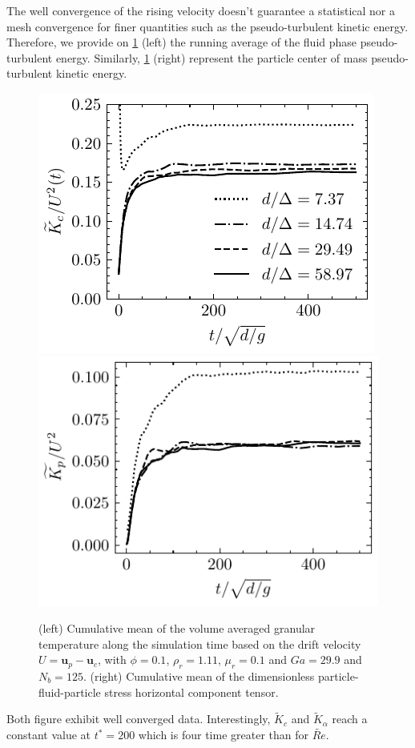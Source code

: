 The well convergence of the rising velocity doesn't guarantee a statistical nor a mesh convergence for finer quantities such as the pseudo-turbulent kinetic energy. 
Therefore, we provide on \ref{fig:UpUp} (left) the running average of the fluid phase pseudo-turbulent energy. 
Similarly, \ref{fig:UpUp} (right) represent the particle center of mass pseudo-turbulent kinetic energy. 
\begin{figure}[h!]
    \centering
    \includegraphics[height = 0.35\textwidth]{image/VALIDATION2.0/fCA/Tcum.pdf}
    \includegraphics[height = 0.35\textwidth]{image/VALIDATION2.0/fPA/Tcum.pdf}
    \caption{(left) Cumulative mean of the volume averaged granular temperature along the simulation time based on the drift velocity $U = \textbf{u}_p - \textbf{u}_c$, with $\phi = 0.1$, $\rho_r = 1.11$, $ \mu_r =0.1$ and $Ga = 29.9$ and $N_b = 125$.
    (right) Cumulative mean of the dimensionless particle-fluid-particle stress horizontal component tensor. }
    \label{fig:UpUp}
\end{figure}
Both figure exhibit well converged data. 
Interestingly, $\widetilde{K}_c$ and $\widetilde{K}_\alpha$ reach a constant value at $t^* = 200$ which is four time greater than for $\widetilde{Re}$.


